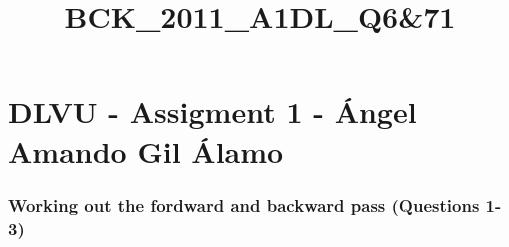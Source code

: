 \documentclass[11pt]{article}
\title{BCK\_2011\_A1DL\_Q6\&71}
\begin{document}
    
    \maketitle
    
    

    
    \hypertarget{dlvu---assigment-1---uxe1ngel-amando-gil-uxe1lamo}{%
\section{DLVU - Assigment 1 - Ángel Amando Gil
Álamo}\label{dlvu---assigment-1---uxe1ngel-amando-gil-uxe1lamo}}

    \hypertarget{working-out-the-fordward-and-backward-pass-questions-1-3}{%
\subsubsection{Working out the fordward and backward pass (Questions
1-3)}\label{working-out-the-fordward-and-backward-pass-questions-1-3}}
\end{document}
